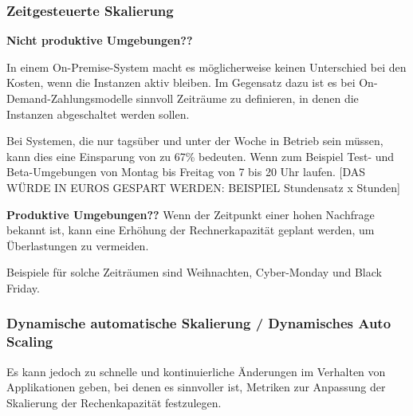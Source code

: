
\subsubsection{Zeitgesteuerte Skalierung}
\textbf{Nicht produktive Umgebungen??}

In einem On-Premise-System macht es möglicherweise keinen Unterschied bei den Kosten, wenn die Instanzen aktiv bleiben. 
Im Gegensatz dazu ist es bei On-Demand-Zahlungsmodelle sinnvoll Zeiträume zu definieren, in denen die Instanzen abgeschaltet werden sollen.

Bei Systemen, die nur tagsüber und unter der Woche in Betrieb sein müssen, kann dies eine Einsparung von zu 67\% bedeuten.  Wenn zum Beispiel Test- und Beta-Umgebungen von Montag bis Freitag von 7 bis 20 Uhr laufen.
[DAS WÜRDE IN EUROS GESPART WERDEN: BEISPIEL Stundensatz x Stunden]


\textbf{Produktive Umgebungen??}
Wenn der Zeitpunkt einer hohen Nachfrage bekannt ist, kann eine Erhöhung der Rechnerkapazität geplant werden, um Überlastungen zu vermeiden.

Beispiele für solche Zeiträumen sind Weihnachten, Cyber-Monday und Black Friday. 


\subsubsection{Dynamische automatische Skalierung / Dynamisches Auto Scaling}
Es kann jedoch zu schnelle und kontinuierliche Änderungen im Verhalten von Applikationen geben, bei denen es sinnvoller ist, Metriken zur Anpassung der Skalierung der Rechenkapazität festzulegen.

